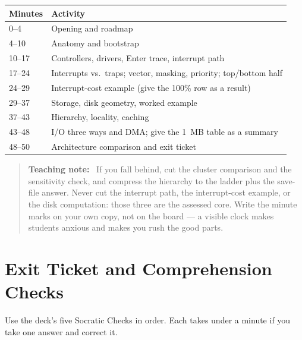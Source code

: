 \documentclass[11pt]{article}
\newenvironment{teachingaside}{\begin{quote}\small\color{primary-gold}\textbf{Teaching note:}\ }{\end{quote}}
\begin{document}
\begin{center}
\small
\begin{tabular}{@{}p{1.8cm}p{13.3cm}@{}}
\toprule
\textbf{Minutes} & \textbf{Activity} \\
\midrule
0--4   & Opening and roadmap \\
4--10  & Anatomy and bootstrap \\
10--17 & Controllers, drivers, Enter trace, interrupt path \\
17--24 & Interrupts vs.\ traps; vector, masking, priority; top/bottom half \\
24--29 & Interrupt-cost example (give the 100\% row as a result) \\
29--37 & Storage, disk geometry, worked example \\
37--43 & Hierarchy, locality, caching \\
43--48 & I/O three ways and DMA; give the 1~MB table as a summary \\
48--50 & Architecture comparison and exit ticket \\
\bottomrule
\end{tabular}
\end{center}

\begin{teachingaside}
If you fall behind, cut the cluster comparison and the sensitivity check, and
compress the hierarchy to the ladder plus the save-file answer. Never cut the
interrupt path, the interrupt-cost example, or the disk computation: those three
are the assessed core. Write the minute marks on your own copy, not on the board
--- a visible clock makes students anxious and makes you rush the good parts.
\end{teachingaside}

\section{Exit Ticket and Comprehension Checks}

Use the deck's five Socratic Checks in order. Each takes under a minute if you
take one answer and correct it.
\end{document}
